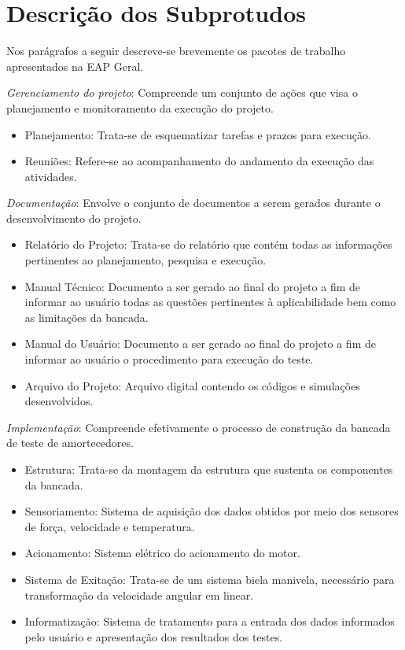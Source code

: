 	\section{Descrição dos Subprotudos}
	\label{sec:tap_subprodutos}

		Nos parágrafos a seguir descreve-se brevemente os pacotes de trabalho apresentados na EAP Geral. 

		\textit{Gerenciamento do projeto}:
		Compreende um conjunto de ações que visa o planejamento e monitoramento da execução do projeto.

		\begin{itemize}
			\item{Planejamento}: Trata-se de esquematizar tarefas e prazos para execução.
			\item{Reuniões}: Refere-se ao acompanhamento do andamento da execução das atividades.
		\end{itemize}

		\textit{Documentação}:
		Envolve o conjunto de documentos a serem gerados durante o desenvolvimento do projeto.

		\begin{itemize}
			\item Relatório do Projeto: Trata-se do relatório que contém todas as informações pertinentes ao planejamento, pesquisa e execução.
			\item Manual Técnico: Documento a ser gerado ao final do projeto a fim de informar ao usuário todas as questões pertinentes à aplicabilidade bem como as limitações da bancada.
			\item Manual do Usuário: Documento a ser gerado ao final do projeto a fim de informar ao usuário o procedimento para execução do teste.
			\item Arquivo do Projeto: Arquivo digital contendo os códigos e simulações desenvolvidos.
		\end{itemize}

		\textit{Implementação}:
		Compreende efetivamente o processo de construção da bancada de teste de amortecedores.

		\begin{itemize}
			\item Estrutura: Trata-se da montagem da estrutura que sustenta os componentes da bancada.
			\item Sensoriamento: Sistema de aquisição dos dados obtidos por meio dos sensores de força, velocidade e temperatura.
			\item Acionamento: Sistema elétrico do acionamento do motor.
			\item Sistema de Exitação: Trata-se de um sistema biela manivela, necessário para transformação da velocidade angular em linear.
			\item Informatização: Sistema de tratamento para a entrada dos dados informados pelo usuário e apresentação dos resultados dos testes.
		\end{itemize}

